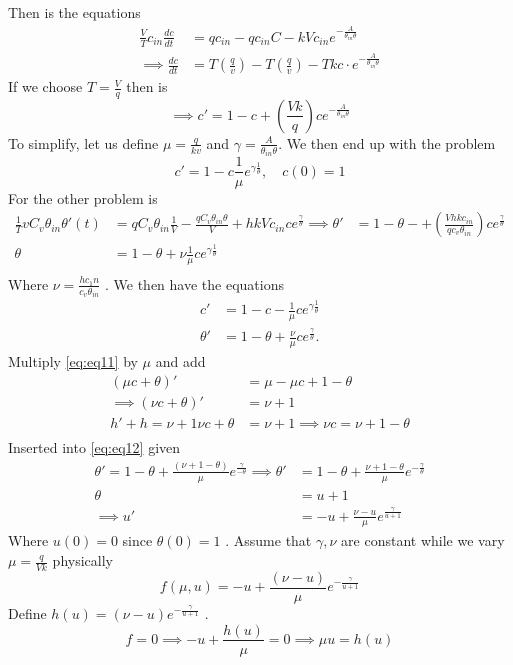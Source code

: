 \documentclass{article}
\theoremstyle{remark}
\begin{document}
Then is the equations \[
  \begin{split}
\frac{V}{T} c_{in} \frac{d c}{d t}  &=  q c_{in} - q c_{in} C - k V c_{in} e^{-\frac{A}{\theta _{in} \theta }}\\ 
 \implies  \frac{d c}{d t}   & = T\left( \frac{q}{v} \right) - T \left( \frac{q}{v} \right) -T kc\cdot e^{-\frac{A}{\theta _{in} \theta }}
  \end{split} 
\] 
If we choose $T = \frac{V}{q}$ then is \[
\implies  c'  = 1- c + \left( \frac{Vk}{q} \right)c e^{-\frac{A}{\theta _{in} \theta }}
\]  
To simplify, let us define $\mu  = \frac{q}{kv}$ and $\gamma = \frac{A}{\theta _{in} \theta }$. We then end up with the problem \[
  c'  = 1- c \frac{1}{\mu } e^{\gamma \frac{1}{\theta } }, \quad  c\left( 0 \right) = 1 
\] 
For the other problem is \[
  \begin{split}
\frac{1}{T} v C_{v} \theta _{in} \theta '  \left( t \right)  & = qC_{v} \theta _{in} \frac{1}{V }  - \frac{q C_{v} \theta _{in} \theta }{V}  + hk V c_{in}c e^{\frac{\gamma}{\theta } }
\implies  \theta '   & = 1 - \theta  - + \left( \frac{Vhkc_{in}}{qc_{v} \theta _{in}}  \right) c e^{\frac{\gamma }{\theta } } \\
\theta &=  1- \theta + \nu \frac{1}{\mu }  c e^{\gamma \frac{1}{\theta } }  \\
  \end{split} 
\]  
Where $\nu  = \frac{h c_{1}n}{c_{v} \theta _{in}} $ . We then have the equations 
\begin{align}
  \label{eq:eq11}
  c'  &=  1- c - \frac{1}{\mu } c e^{\gamma \frac{1}{\theta } } \\
  \label{eq:eq12}
  \theta '  &=  1- \theta  + \frac{\nu}{\mu }ce^{\frac{\gamma}{\theta } }   
.\end{align}
Multiply \eqref{eq:eq11}  by $\mu $ and add \[
  \begin{split}
\left( \mu c + \theta  \right)'  &=  \mu  - \mu  c + 1 - \theta  \\
\implies  \left( \nu c + \theta  \right) '   & = \nu + 1  \\
h'  + h = \nu +1
\nu c + \theta &=  \nu +1 \implies  \nu c = \nu + 1 - \theta  \\
  \end{split} 
\] 
Inserted into \eqref{eq:eq12}  given \[
  \begin{split}
\theta '  = 1 - \theta  + \frac{\left( \nu +1 - \theta   \right)}{ \mu }  e^{\frac{\gamma }{- \theta } }
\implies  \theta '  &=  1- \theta + \frac{\nu  + 1 - \theta }{\mu } e^{- \frac{\gamma }{\theta } } \\
\theta  & = u +1  \\
\implies  u'   & = -u + \frac{\nu  - u}{ \mu }  e^{\frac{\gamma}{u+1} }
  \end{split} 
\] 
Where $u\left( 0 \right) = 0$ since $\theta \left( 0 \right) = 1$ . Assume that $\gamma , \nu $ are constant while we vary $\mu = \frac{q}{Vk}$ physically \[
f\left( \mu , u \right)  = -u + \frac{\left( \nu - u \right)}{\mu }  e^{-\frac{\gamma }{u+1} }
\] 
Define $h\left( u \right) = \left( \nu - u \right) e^{- \frac{\gamma }{u+1} }$ . \[
f = 0 \implies  -u + \frac{h\left( u \right)}{\mu } = 0 \implies  \mu  u = h\left( u \right) 
\] 
\end{document}
